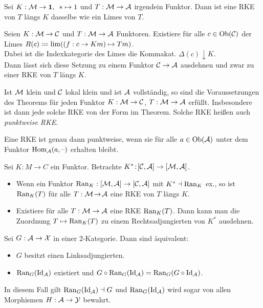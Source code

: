 \documentclass{cheat-sheet}
\begin{document}
\begin{bsp}
  Sei $K : \mathcal{M} \to \mathbf{1}, \enspace * \mapsto 1$ und $T : \mathcal{M} \to \mathcal{A}$ irgendein Funktor. Dann ist eine RKE von $T$ längs $K$ dasselbe wie ein Limes von $T$.
\end{bsp}

\begin{thm}
  Seien $K : \mathcal{M} \to \mathcal{C}$ und $T : \mathcal{M} \to \mathcal{A}$ Funktoren.
  Existiere für alle $c \in \operatorname{Ob}(\mathcal{C})$ der Limes
  $R(c) \coloneqq \lim ((f : c \to Km) \mapsto Tm)$. \\
  Dabei ist die Indexkategorie des Limes die Kommakat. $\Delta(c) \downarrow K$. \\
  Dann lässt sich diese Setzung zu einem Funktor $\mathcal{C} \to \mathcal{A}$ ausdehnen und zwar zu einer RKE von $T$ längs $K$.
\end{thm}

\begin{bem}
  Ist $\mathcal{M}$ klein und $\mathcal{C}$ lokal klein und ist $\mathcal{A}$ vollständig, so sind die Voraussetzungen des Theorems für jeden Funktor $K : \mathcal{M} \to \mathcal{C}$, $T : \mathcal{M} \to \mathcal{A}$ erfüllt. Insbesondere ist dann jede solche RKE von der Form im Theorem. Solche RKE heißen auch \emph{punktweise RKE}.
\end{bem}

\begin{lem}
  Eine RKE ist genau dann punktweise, wenn sie für alle $a \in \operatorname{Ob}(\mathcal{A})$ unter dem Funktor $\operatorname{Hom}_{\mathcal{A}}(a, \text{--})$ erhalten bleibt.
\end{lem}

\begin{thm}
  Sei $K \!:\! M \to C$ ein Funktor. Betrachte $K^* \!:\! [\mathcal{C}, \mathcal{A}] \to [\mathcal{M}, \mathcal{A}]$.
  \begin{itemize}
    \item Wenn ein Funktor $\operatorname{Ran}_K : [\mathcal{M},\mathcal{A}] \to [\mathcal{C}, \mathcal{A}]$ mit $K^* \dashv \operatorname{Ran}_K$ ex., so ist $\operatorname{Ran}_K(T)$ für alle $T : \mathcal{M} \!\to\! \mathcal{A}$ eine RKE von $T$ längs $K$.
    \item Existiere für alle $T : \mathcal{M} \to \mathcal{A}$ eine RKE $\operatorname{Ran}_K(T)$. Dann kann man die Zuordnung $T \mapsto \operatorname{Ran}_K(T)$ zu einem Rechtsadjungierten von $K^*$ ausdehnen.
  \end{itemize}
\end{thm}

\begin{thm}
  Sei $G : \mathcal{A} \to \mathcal{X}$ in einer 2-Kategorie. Dann sind äquivalent:
  \begin{itemize}
    \item $G$ besitzt einen Linksadjungierten.
    \item $\operatorname{Ran}_G(\operatorname{Id}_{\mathcal{A}})$ existiert und $G \circ \operatorname{Ran}_G(\operatorname{Id}_{\mathcal{A}}) = \operatorname{Ran}_G(G \circ \operatorname{Id}_{\mathcal{A}})$.
  \end{itemize}
  In diesem Fall gilt $\operatorname{Ran}_G(\operatorname{Id}_{\mathcal{A}}) \dashv G$ und $\operatorname{Ran}_G(\operatorname{Id}_{\mathcal{A}})$ wird sogar von allen Morphismen $H : \mathcal{A} \to \mathcal{Y}$ bewahrt.
\end{thm}
\end{document}
